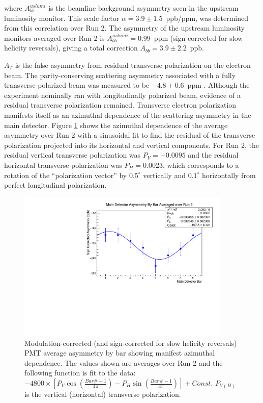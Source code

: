 where $A_{bb}^{uslumi}$ is the beamline background asymmetry seen in the upstream luminosity monitor. This scale factor $\alpha=3.9\pm 1.5$~ppb/ppm, was determined from this correlation over Run 2. The asymmetry of the upstream luminosity monitors averaged over Run 2 is  $A_{bb}^{uslumi}=0.99$~ppm (sign-corrected for slow helicity reversals), giving a total correction $A_{bb}=3.9\pm2.2$~ppb.

$A_T$ is the false asymmetry from residual transverse polarization on the electron beam. The parity-conserving scattering asymmetry associated with a fully transverse-polarized beam was measured to be $-4.8\pm 0.6$~ppm \cite{Waidyawansa}. Although the \Qs experiment nominally ran with longitudinally polarized beam, evidence of a residual transverse polarization remained. Transverse electron polarization manifests itself as an azimuthal dependence of the scattering asymmetry in the main detector. Figure \ref{fig:transverse_fit} shows the azimuthal dependence of the average asymmetry over Run 2 with a sinusoidal fit to find the residual of the transverse polarization projected into its horizontal and vertical components. For Run 2, the residual vertical transverse polarization was $P_V=-0.0095$ and the residual horizontal transverse polarization was $P_H=0.0023$, which corresponds to a rotation of the ``polarization vector'' by $0.5^{\circ}$ vertically and $0.1^{\circ}$ horizontally from perfect longitudinal polarization.
\begin{figure}[ht]
\begin{center}
\includegraphics[width=4in]{./Pictures/transverse_fit.pdf}
\caption{\label{fig:transverse_fit}Modulation-corrected (and sign-corrected for slow helicity reversals) PMT average  asymmetry by bar showing manifest azimuthal dependence. The values shown are averages over Run 2 and the following function is fit to the data: $-4800\times\left[P_V\cos{\left(\frac{Bar\#-1}{4\pi}\right)-P_H\sin{\left(\frac{Bar\#-1}{4\pi}\right)}}\right]+Const$. $P_{V(H)}$ is the vertical (horizontal) transverse polarization.}
\end{center}
\end{figure}

